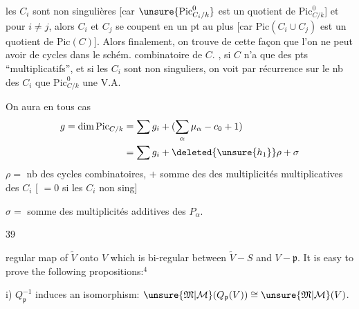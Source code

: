  les $C_i$ sont non singulières
[car $\unsure{\mathrm{Pic}_{C_i/k}^0}$ est un quotient de $\mathrm{Pic}_{C/k}^0$] et 
pour $i\ne j$, alors $C_i$ et $C_j$ se coupent en un pt au plus
[car $\mathrm{Pic}(C_i\cup C_j)$ est un quotient de $\mathrm{Pic}(C)$].
Alors finalement, on trouve de cette façon que l'on ne peut avoir de cycles
dans le schém. combinatoire de $C$. 
, si $C$ n'a que des pts 
``multiplicatifs'', et si les $C_i$ sont non singuliers, on voit par récurrence sur le nb des $C_i$ que
 $\mathrm{Pic}_{C/k}^0$  une V.A.

On aura en tous cas
\[
\begin{aligned}
g=\dim\mathrm{Pic}_{C/k}&=\sum g_i+(\sum_\alpha\mu_\alpha-c_0+1)\\
&=\sum g_i+\deleted{\unsure{h_1}}\rho+\sigma
\end{aligned}
\]
$\rho=$ nb des cycles combinatoires, $+$ somme des  des multiplicités multiplicatives des $C_i$
[ $=0$ si les $C_i$ non sing]

$\sigma=$ somme des multiplicités additives des $P_\alpha$.

\begin{center}39\end{center}
regular map of $\widetilde V$ onto $V$ which is bi-regular between $\widetilde V-S$ and $V-\mathfrak p$. It is easy to prove the following propositions:$^4$

i) $Q_{\mathfrak p}^{-1}$ induces an isomorphism: $\unsure{\mathfrak M|\mathcal M}(Q_{\mathfrak p}(V))\cong\unsure{\mathfrak M|\mathcal M}(V)$.

